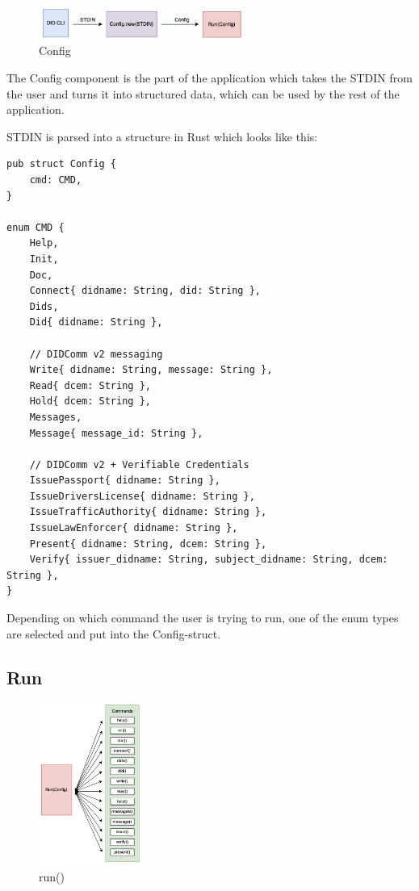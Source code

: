 \begin{figure}
\centering
\includegraphics[width=0.6\textwidth]{Architecture 1442df162dbe45f4a423ba37d3e12363/Untitled 2.png}
\caption{Config}
\end{figure}

The Config component is the part of the application which takes the
STDIN from the user and turns it into structured data, which can be used
by the rest of the application.

STDIN is parsed into a structure in Rust which looks like this:

\begin{lstlisting}
pub struct Config {
    cmd: CMD,
}

enum CMD {
    Help,
    Init,
    Doc,
    Connect{ didname: String, did: String },
    Dids,
    Did{ didname: String },

    // DIDComm v2 messaging
    Write{ didname: String, message: String },
    Read{ dcem: String },
    Hold{ dcem: String },
    Messages,
    Message{ message_id: String },

    // DIDComm v2 + Verifiable Credentials
    IssuePassport{ didname: String },
    IssueDriversLicense{ didname: String },
    IssueTrafficAuthority{ didname: String },
    IssueLawEnforcer{ didname: String },
    Present{ didname: String, dcem: String },
    Verify{ issuer_didname: String, subject_didname: String, dcem: String },
}
\end{lstlisting}

Depending on which command the user is trying to run, one of the enum
types are selected and put into the Config-struct.


\pagebreak



\hypertarget{run}{%
\subsection{Run}\label{run}}

\begin{figure}
\centering
\includegraphics[width=0.3\textwidth]{Architecture 1442df162dbe45f4a423ba37d3e12363/Untitled 3.png}
\caption{run()}
\end{figure}

